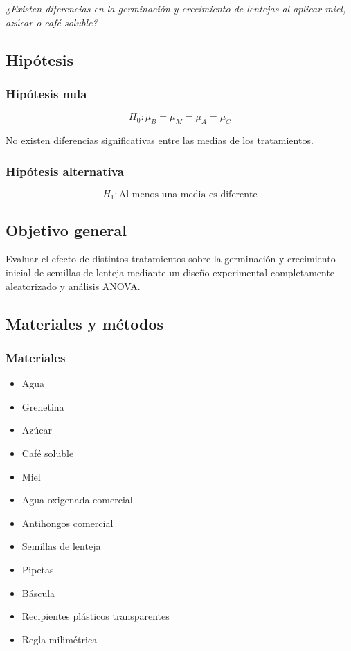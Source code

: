 \begin{center}
\textit{¿Existen diferencias en la germinación y crecimiento de lentejas al aplicar miel, azúcar o café soluble?}
\end{center}

\subsection{Hipótesis}

\subsubsection{Hipótesis nula}

\[
H_0:\mu_B=\mu_M=\mu_A=\mu_C
\]

No existen diferencias significativas entre las medias de los tratamientos.

\subsubsection{Hipótesis alternativa}

\[
H_1:\text{Al menos una media es diferente}
\]

\subsection{Objetivo general}

Evaluar el efecto de distintos tratamientos sobre la germinación y crecimiento inicial de semillas de lenteja mediante un diseño experimental completamente aleatorizado y análisis ANOVA.

\subsection{Materiales y métodos}

\subsubsection{Materiales}

\begin{itemize}
    \item Agua
    \item Grenetina
    \item Azúcar
    \item Café soluble
    \item Miel
    \item Agua oxigenada comercial
    \item Antihongos comercial
    \item Semillas de lenteja
    \item Pipetas
    \item Báscula
    \item Recipientes plásticos transparentes
    \item Regla milimétrica
\end{itemize}

